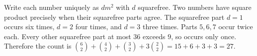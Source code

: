 Write each number uniquely as $dm^2$ with $d$ squarefree. Two numbers have square product precisely when their squarefree parts agree. The squarefree part $d=1$ occurs six times, $d=2$ four times, and $d=3$ three times. Parts $5,6,7$ occur twice each. Every other squarefree part at most $36$ exceeds $9$, so occurs only once. Therefore the count is $\binom62+\binom42+\binom32+3\binom22=15+6+3+3=\boxed{27}$.

